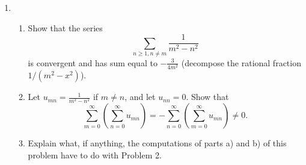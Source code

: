 \documentclass{article}%
\newenvironment{proof}[1][Proof]{\textbf{#1.} }{\ \rule{0.5em}{0.5em}}
\begin{document}
\begin{enumerate}
\bigskip
\textbf{Collaborators:}\\
\smallskip
 
\textbf{Solution:}
\begin{proof}
Since $J$ is countably infinite, we may assume $J = \{j_i\}_{i=0}^{\infty}$. \\[2pt]
\textbf{(a) $\to$ (b):}
Since $\sum_{j\in J}f(j)$ converges unconditionally, $\forall \epsilon > 0$, $\exists$ a finite set $F_0$, $\forall F\supset F_0$,
$$
\left|\sum_{j\in F}f(j)-\sum_{i=1}^{\infty}f(j_i)\right|<\epsilon.
$$
Since $\phi$ is a bijection, there $\exists N > 0$, $\phi(\{1, 2, \cdots, N\})\supset F_0$. Denote $\phi(\{1, 2, \cdots, N\}) = F$, then
$$
\left|\sum_{i=1}^{N}f(\phi(i))-\sum_{i=1}^{\infty}f(j_i)\right| = \left|\sum_{i=1}^{N}f(\phi(i))-\sum_{i=1}^{\infty}f(\phi(j_i))\right| < \epsilon.
$$
Thus the series converges, and the sum is $\sum_{j\in J}f(j)$. \\[2pt]
\textbf{(b) $\to$ (c):}
Denote $A = \{i|f(j_i) > 0\}, B = \{i|f(j_i) < 0\}$. If $\#A < \infty$, then $S_1 = \sum_{i\in A} f(i) < \infty$. We can set the bijection as $\phi(i) = k\in A, ~1\le i \le \#A$, and make the rest part a bijection to $B$. Since the series converges, we can know that $\sum_{i\in B} f(i)$ converges. Thus $\sum|f(j)| \le S1+\sum_{i\in B}f(i)$ also converges. Similarly, if $\#B < \infty$ we can get the same result. If $\#A, \#B = \infty$, we can 


\textbf{(c) $\to$ (a):}
If $\sum_{j\in J}|f(j)|$ converges, then $\forall \epsilon > 0$, there $\exists N > 0$, s.t. $\sum_{i= N}^{\infty} |f(j_i)| \le \epsilon$. Then for this $\epsilon$, we take $F_0 = \{a_1, a_2, \cdots, a_{N-1}\}$, then 
\end{proof}
\bigskip



\item \begin{enumerate}
\item Show that the series \[
\sum_{n\geq 1, n\neq m} \frac{1}{m^2 - n^2}\]is convergent and has sum equal to $-\frac{3}{4m^2}$ (decompose the rational fraction $1/(m^2 - x^2)$).
\item Let $u_{mn} = \frac{1}{m^2 - n^2}$ if $m\neq n$, and let $u_{nn} = 0$. Show that \[
\sum_{m=0}^{\infty}\left(\sum_{n=0}^{\infty} u_{mn}\right) = -\sum_{n=0}^{\infty}\left(\sum_{m=0}^{\infty} u_{mn}\right) \neq 0.\]
\item Explain what, if anything, the computations of parts a) and b) of this problem have to do with Problem 2.
\end{enumerate}



\end{enumerate}
\end{document}
